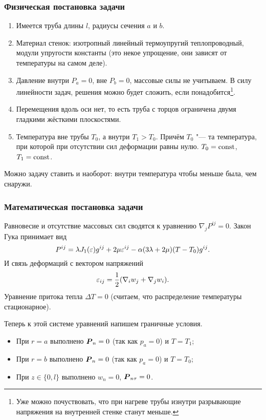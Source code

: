 \subsubsection{Физическая постановка задачи}
\begin{enumerate}
\item Имеется труба длины $l$, радиусы сечения $a$ и $b$.
\item Материал стенок: изотропный линейный термоупругий теплопроводный, модули упругости константы (это некое упрощение, они зависят от температуры на самом деле).
\item Давление внутри $P_a=0$, вне $P_b=0$, массовые силы не учитываем. В силу линейности задач, решения можно будет сложить, если понадобится\footnote{Уже можно почуствовать, что при нагреве трубы изнутри разрывающие напряжения на внутренней стенке станут меньше.}.
\item Перемещения вдоль оси нет, то есть труба с торцов ограничена двумя гладкими жёсткими плоскостями.
\item Температура вне трубы $T_0$, а внутри $T_1>T_0$. Причём $T_0$ "--- та температура, при которой при отсутствии сил деформации равны нулю. $T_0=\operatorname{const}$, $T_1=\operatorname{const}$.
\end{enumerate}

Можно задачу ставить и наоборот: внутри температура чтобы меньше была, чем снаружи.

\subsubsection{Математическая постановка задачи}
Равновесие и отсутствие массовых сил сводятся к уравнению $\nabla_j P^{ij} = 0$.
Закон Гука принимает вид
\[
  P^{ij} = \lambda J_1(\varepsilon) g^{ij} + 2\mu \varepsilon^{ij} - \alpha(3\lambda+2\mu)(T-T_0)g^{ij}.
\]
И связь деформаций с вектором напряжений
\[
  \varepsilon_{ij} = \frac12(\nabla_i w_j+\nabla_j w_i).
\]
Уравнение притока тепла $\Delta T=0$ (считаем, что распределение температуры стационарное).

Теперь к этой системе уравнений напишем граничные условия.
\begin{itemize}
\item При $r=a$ выполнено $\boldsymbol{P}_n=0$ (так как $p_a=0$) и $T=T_1$;
\item При $r=b$ выполнено $\boldsymbol{P}_n=0$ (так как $p_a=0$) и $T=T_0$;
\item При $z\in\{0,l\}$ выполнено $w_{n} = 0$, $\boldsymbol{P}_{n\tau} = 0$.
\end{itemize}

